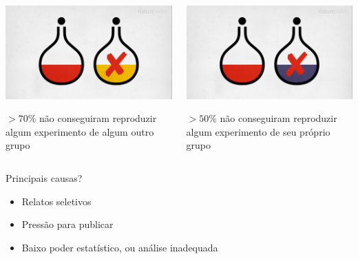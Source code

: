 \documentclass{beamer}
\begin{document}
\begin{frame}
  \begin{center}

    \begin{columns}
      \begin{column}{5cm}
        \includegraphics[width=\textwidth]{Imagens/reprod-nature1}

$>70\%$ não conseguiram reproduzir algum experimento de algum outro grupo
      \end{column}
      \begin{column}{5cm}
        \includegraphics[width=\textwidth]{Imagens/reprod-nature2}

$>50\%$ não conseguiram reproduzir algum experimento de seu próprio grupo
      \end{column}
    \end{columns}
  \end{center}
\end{frame}

\begin{frame}
  \begin{block}{Principais causas?}
    \begin{itemize}
    \item Relatos seletivos
    \item Pressão para publicar
    \item Baixo poder estatístico, ou análise inadequada
    \end{itemize}
  \end{block}
\end{frame}
\end{document}
